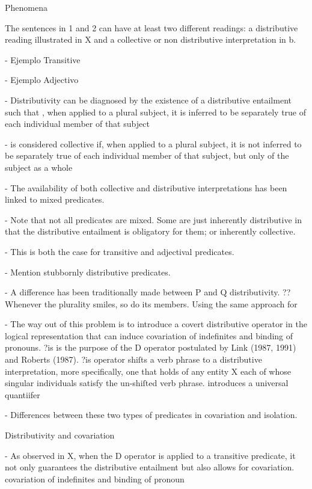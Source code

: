 \documentclass[a4paper]{article}
\begin{document}
Phenomena

The sentences in 1 and 2 can have at least two different readings: a distributive reading illustrated in X and a collective or non distributive interpretation in b. 

- Ejemplo Transitive

- Ejemplo Adjectivo 


- Distributivity can be diagnosed by the existence of a distributive entailment such that , when applied to a plural subject, it is inferred to be separately true of each individual member of that subject

- is considered collective if, when applied to a plural subject, it is not inferred to be separately true of each individual member of that subject, but only of the subject as a whole

- The availability of both collective and distributive interpretations has been linked to mixed predicates. 

- Note that not all predicates are mixed. Some are just inherently distributive in that the distributive entailment is obligatory for them; or inherently collective. 

- This is both the case for transitive and adjectival predicates. 

- Mention stubbornly distributive predicates. 

- A difference has been traditionally made between P and Q distributivity. ?? 
Whenever the plurality smiles, so do its members. 
Using the same approach for 

- The way out of this problem is to introduce a covert distributive operator in the logical representation that can induce covariation of indefinites and binding of pronouns. ?is is the purpose of the D operator postulated by Link (1987, 1991) and Roberts (1987). ?is operator shiſts a verb phrase to a distributive interpretation, more specifically, one that holds of any entity X each of whose singular individuals satisfy the un-shiſted verb phrase.
introduces a universal quantiifer


- Differences between these two types of predicates in covariation and isolation. 

Distributivity and covariation

- As observed in X, when the D operator is applied to a transitive predicate, it not only guarantees the distributive entailment but also allows for covariation. covariation of indefinites and binding of pronoun
\end{document}
